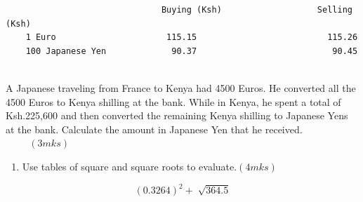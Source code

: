 \documentclass[
  a4paperpaper,
]{scrbook}
\providecommand{\tightlist}{%
  \setlength{\itemsep}{0pt}\setlength{\parskip}{0pt}}\usepackage{longtable,booktabs,array}
\begin{document}
\begin{tcolorbox}
\begin{verbatim}
                               Buying (Ksh)                   Selling (Ksh)
    1 Euro                      115.15                          115.26
    100 Japanese Yen             90.37                           90.45
    
\end{verbatim}

A Japanese traveling from France to Kenya had 4500 Euros. He converted
all the 4500 Euros to Kenya shilling at the bank. While in Kenya, he
spent a total of Ksh.225,600 and then converted the remaining Kenya
shilling to Japanese Yens at the bank. Calculate the amount in Japanese
Yen that he received. \(\hspace{1cm} (3mks)\)

\begin{enumerate}
\def\labelenumi{\arabic{enumi}.}
\setcounter{enumi}{3}
\tightlist
\item
  Use tables of square and square roots to
  evaluate.\(\hspace{0cm} (4mks)\)
\end{enumerate}

\[(0.3264)^2+\sqrt[]{364.5}\]


\end{tcolorbox}
\end{document}

